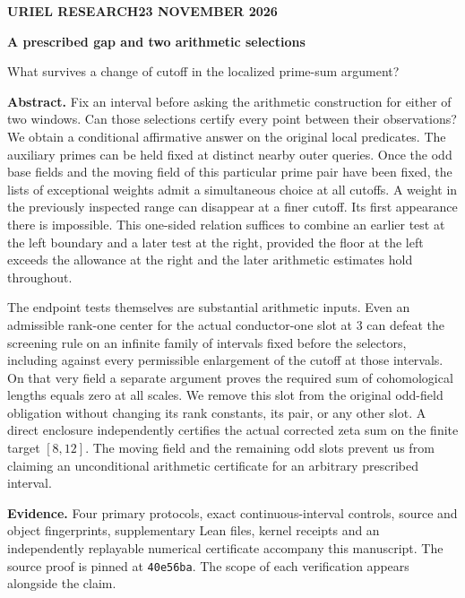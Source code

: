 \documentclass[12pt,letterpaper]{article}
\begin{document}
\thispagestyle{plain}
{\sffamily\small\bfseries\color{accent}URIEL RESEARCH\hfill 23 NOVEMBER 2026}\par\vspace{15pt}
{\Huge\bfseries\color{ink}A prescribed gap and two arithmetic selections\par}\vspace{8pt}
{\Large\color{mute}What survives a change of cutoff in the localized prime-sum argument?\par}\vspace{14pt}
\textbf{Abstract.} Fix an interval before asking the arithmetic construction for either of two windows. Can those selections certify every point between their observations? We obtain a conditional affirmative answer on the original local predicates. The auxiliary primes can be held fixed at distinct nearby outer queries. Once the odd base fields and the moving field of this particular prime pair have been fixed, the lists of exceptional weights admit a simultaneous choice at all cutoffs. A weight in the previously inspected range can disappear at a finer cutoff. Its first appearance there is impossible. This one-sided relation suffices to combine an earlier test at the left boundary and a later test at the right, provided the floor at the left exceeds the allowance at the right and the later arithmetic estimates hold throughout.

The endpoint tests themselves are substantial arithmetic inputs. Even an admissible rank-one center for the actual conductor-one slot at 3 can defeat the screening rule on an infinite family of intervals fixed before the selectors, including against every permissible enlargement of the cutoff at those intervals. On that very field a separate argument proves the required sum of cohomological lengths equals zero at all scales. We remove this slot from the original odd-field obligation without changing its rank constants, its pair, or any other slot. A direct enclosure independently certifies the actual corrected zeta sum on the finite target \([8,12]\). The moving field and the remaining odd slots prevent us from claiming an unconditional arithmetic certificate for an arbitrary prescribed interval.

\medskip\textbf{Evidence.} Four primary protocols, exact continuous-interval controls, source and object fingerprints, supplementary Lean files, kernel receipts and an independently replayable numerical certificate accompany this manuscript. The source proof is pinned at \texttt{40e56ba}. The scope of each verification appears alongside the claim.
\clearpage\tableofcontents
\end{document}
